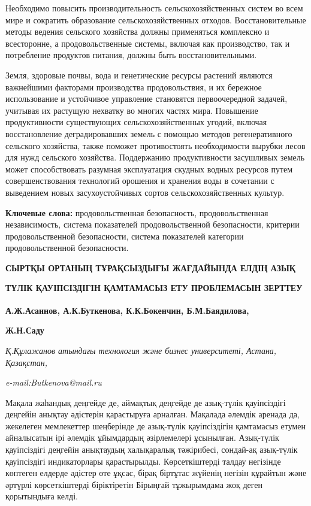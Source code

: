 {Необходимо повысить производительность сельскохозяйственных систем во
всем мире и сократить образование сельскохозяйственных отходов.
Восстановительные методы ведения сельского хозяйства должны применяться
комплексно и всесторонне, а продовольственные системы, включая как
производство, так и потребление продуктов питания, должны быть
восстановительными.

Земля, здоровые почвы, вода и генетические ресурсы растений являются
важнейшими факторами производства продовольствия, и их бережное
использование и устойчивое управление становятся первоочередной задачей,
учитывая их растущую нехватку во многих частях мира. Повышение
продуктивности существующих сельскохозяйственных угодий, включая
восстановление деградировавших земель с помощью методов регенеративного
сельского хозяйства, также поможет противостоять необходимости вырубки
лесов для нужд сельского хозяйства. Поддержанию продуктивности
засушливых земель может способствовать разумная эксплуатация скудных
водных ресурсов путем совершенствования технологий орошения и хранения
воды в сочетании с выведением новых засухоустойчивых сортов
сельскохозяйственных культур.

{\bfseries Ключевые слова:} продовольственная безопасность,
продовольственная независимость, система показателей продовольственной
безопасности, критерии продовольственной безопасности, система
показателей категории продовольственной безопасности.

{\bfseries СЫРТҚЫ ОРТАНЫҢ ТҰРАҚСЫЗДЫҒЫ ЖАҒДАЙЫНДА ЕЛДІҢ АЗЫҚ}

{\bfseries ТҮЛІК ҚАУІПСІЗДІГІН ҚАМТАМАСЫЗ ЕТУ ПРОБЛЕМАСЫН ЗЕРТТЕУ}

{\bfseries А.Ж.Асаинов, А.К.Буткенова\textsuperscript{\envelope }, К.К.Бокенчин,
Б.М.Баядилова,}

{\bfseries Ж.Н.Саду}

\emph{Қ.Құлажанов атындағы технология және бизнес университеті, Астана,
Қазақстан,}

\emph{e-mail:Butkenova@mail.ru}

Мақала жаһандық деңгейде де, аймақтық деңгейде де азық-түлік
қауіпсіздігі деңгейін анықтау әдістерін қарастыруға арналған. Мақалада
әлемдік аренада да, жекелеген мемлекеттер шеңберінде де азық-түлік
қауіпсіздігін қамтамасыз етумен айналысатын ірі әлемдік ұйымдардың
әзірлемелері ұсынылған. Азық-түлік қауіпсіздігі деңгейін анықтаудың
халықаралық тәжірибесі, сондай-ақ азық-түлік қауіпсіздігі индикаторлары
қарастырылды. Көрсеткіштерді талдау негізінде көптеген елдерде әдістер
өте ұқсас, бірақ біртұтас жүйенің негізін құрайтын және әртүрлі
көрсеткіштерді біріктіретін Бірыңғай тұжырымдама жоқ деген қорытындыға
келді.

}
